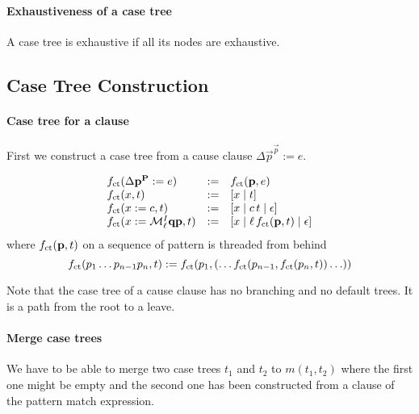 \paragraph{Exhaustiveness of a case tree}
%
A case tree is exhaustive if all its nodes are exhaustive.





\subsection{Case Tree Construction}

\paragraph{Case tree for a clause}
First we construct a case tree from a cause clause
$\Delta \vec p^{\Vec p} := e$.

$$
\begin{array}{lll}
    f_\text{ct}(\Delta {\mathbf p}^{{\mathbf P}} := e) &:=& f_\text{ct}({\mathbf p}, e)
    \\
    f_\text{ct}(x, t) &:=& [x \mid t]
    \\
    f_\text{ct}(x := c, t) &:=& [x \mid c\, t \mid \epsilon ]
    \\
    f_\text{ct}(x := {\cal M}^I_\ell {\mathbf q} {\mathbf p}, t)
                   &:=&
                   [x \mid \ell\, f_\text{ct}({\mathbf p}, t) \mid \epsilon ]
\end{array}
$$
%
where $f_\text{ct}({\mathbf p}, t)$ on a sequence of pattern is threaded from behind
%
$$
f_\text{ct}(p_1 \ldots p_{n-1} p_n, t)
:=
f_\text{ct}(p_1, (\ldots f_\text{ct}(p_{n-1}, f_\text{ct}(p_n, t))\ldots))
$$


Note that the case tree of a cause clause has no branching and no default trees.
It is a path from the root to a leave.



\paragraph{Merge case trees} We have to be able to merge two case trees $t_1$
and $t_2$ to $m(t_1, t_2)$ where the first one might be empty and the second one
has been constructed from a clause of the pattern match expression.

